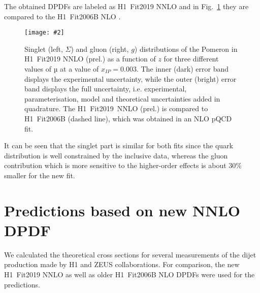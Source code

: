 \documentclass{PoS}
\newcommand{\IP}{I\!\!P}
\newcommand{\includegraphicss}[2][]{\texttt{[image: \#2]}}
\begin{document}
The obtained DPDFs are labeled as H1~Fit2019 NNLO and in Fig.~\ref{figDPDF} they are compared to the H1~Fit2006B NLO \cite{Aktas:2006hy}.
\begin{figure}[h]
\centering
\includegraphicss[trim={0cm 0.5cm 0 1.5cm},clip,width=.7\textwidth]{{{plots/H1prelim-19-013.fig1}}}
\caption{ Singlet (left, $\Sigma$) and gluon (right, $g$) distributions of the Pomeron in H1~Fit2019 NNLO (prel.) as a function of $z$ for three different values of $µ$ at a value of $x_{\IP} = 0.003$. The inner (dark) error band displays the experimental uncertainty, while the outer (bright) error band displays the full uncertainty, i.e. experimental, parameterisation, model and theoretical uncertainties added in quadrature. The H1~Fit2019~NNLO (prel.) is compared to H1~Fit2006B (dashed line), which was obtained in an NLO pQCD fit.}
\label{figDPDF}
\end{figure}
%
It can be seen that the singlet part is similar for both fits since the quark distribution is well constrained by the inclusive data, whereas the gluon contribution which is more sensitive to the higher-order effects is about 30\% smaller for the new fit.


\section{Predictions based on new NNLO DPDF}

We calculated the theoretical cross sections for several measurements of the dijet production made by H1 and ZEUS collaborations.
For comparison, the new H1~Fit2019 NNLO as well as older H1~Fit2006B NLO DPDFs \cite{Aktas:2006hy} were used for the predictions.
\end{document}
